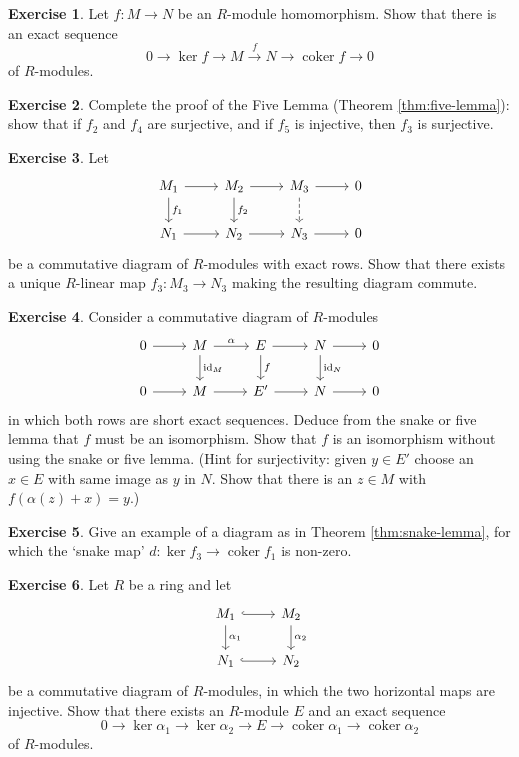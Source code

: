 \documentclass[11pt]{amsbook}
\newcommand{\longto}{\longrightarrow}
\DeclareMathOperator\coker{coker}
\def\id{{\rm id}}
\theoremstyle{plain}
\theoremstyle{definition}
\newtheorem{exercise}{Exercise}
\begin{document}
\begin{exercise}Let $f\colon M\to  N$ be an $R$-module homomorphism. Show that there is an exact sequence
\[
	0 \longto \ker f \longto M \overset{f}{\longto} N \longto \coker f \longto 0
\]
of $R$-modules.
\end{exercise}

\begin{exercise}\label{exc:five-lemma-part-2}
Complete the proof of the Five Lemma (Theorem \ref{thm:five-lemma}): show that if $f_2$ and $f_4$ are surjective, and if $f_5$ is injective, then $f_3$ is surjective. 
\end{exercise}

\begin{exercise}
Let
\[
\begin{tikzcd}
	M_1 \arrow{r} \arrow{d}{f_1}
	& M_2  \arrow{r} \arrow{d}{f_2}
	& M_3 \arrow{r} \arrow[dashed]{d}{}  & 0 \\
 N_1 \arrow{r} & N_2 \arrow{r} & N_3 \arrow{r} & 0
\end{tikzcd}
\]
be a commutative diagram of $R$-modules with exact rows. Show that there exists a unique $R$-linear map $f_3\colon M_3 \to N_3$ making the resulting diagram commute.
\end{exercise}

\begin{exercise}\label{exc:morphism-of-extensions-is-isomorphism}
Consider a commutative diagram of $R$-modules
\[
\begin{tikzcd}
0 \arrow{r}
	& M \arrow{r}{\alpha} \arrow{d}{\id_M}
	& E \arrow{r} \arrow{d}{f}
	& N \arrow{r} \arrow{d}{\id_N} & 0 \\
0 \arrow{r} & M \arrow{r} & E' \arrow{r} & N \arrow{r} & 0
\end{tikzcd}
\]
in which both rows are short exact sequences. Deduce from the snake or five lemma that $f$ must be an isomorphism. Show that $f$ is  an isomorphism without using the snake or five lemma. (Hint for surjectivity: given $y\in E'$ choose an $x\in E$ with same image as $y$ in $N$. Show that there is an $z\in M$ with $f(\alpha(z)+x)=y$.)
\end{exercise}

\begin{exercise}
Give an example of a diagram as in Theorem \ref{thm:snake-lemma}, for which the `snake map' $d\colon \ker f_3 \to \coker f_1$ is non-zero.
\end{exercise}


\begin{exercise}\label{exc:square-snake}
Let $R$ be a ring and let
\[
\begin{tikzcd}
M_1 \arrow[hook]{r} \arrow{d}{\alpha_1} & M_2 \arrow{d}{\alpha_2} \\
N_1 \arrow[hook]{r} & N_2 
\end{tikzcd}
\]
be a commutative diagram of $R$-modules, in which the two horizontal maps are injective. Show that there exists an $R$-module $E$ and an exact sequence
\[
	0 \longto \ker \alpha_1 \longto \ker \alpha_2 \longto E \longto \coker \alpha_1 \longto \coker \alpha_2
\]
of $R$-modules.
\end{exercise}
\end{document}
